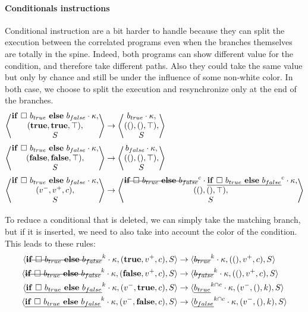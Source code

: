 \documentclass[a4paper,11pt]{article}
\newcommand\mathst[1]{\text{\st{$#1$}}}
\newcommand\mathul[1]{\text{\ul{$#1$}}}
\newcommand\rtstate[3]{\langle #1, #2, #3\rangle}
\newcommand\vrtstate[3]{\left\langle\begin{matrix}#1,\\#2,\\#3\end{matrix}\right\rangle}
\begin{document}
\paragraph{Conditionals instructions} Conditional instruction are a bit harder to handle because they can split the execution between the correlated programs even when the branches themselves are totally in the spine. Indeed, both programs can show different value for the condition, and therefore take different paths. Also they could take the same value but only by chance and still be under the influence of some non-white color. In both case, we choose to split the execution and resynchronize only at the end of the branches.
\begin{align*}
\vrtstate{\mathbf{if}\ \square\ b_{true}\ \mathbf{else}\ b_{false} \cdot  \kappa}{(\mathbf{true}, \mathbf{true}, \top)}{S} &\rightarrow \vrtstate{b_{true} \cdot \kappa}{((), (), \top)}{S}\\
\vrtstate{\mathbf{if}\ \square\ b_{true}\ \mathbf{else}\ b_{false} \cdot  \kappa}{(\mathbf{false}, \mathbf{false}, \top)}{S} &\rightarrow \vrtstate{b_{false} \cdot \kappa}{((), (), \top)}{S}\\
\vrtstate{\mathbf{if}\ \square\ b_{true}\ \mathbf{else}\ b_{false} \cdot \kappa}{(v^-, v^+, c)}{S} &\rightarrow \vrtstate{\mathst{\mathbf{if}\ \square\ b_{true}\ \mathbf{else}\ b_{false}}^c \cdot \mathul{\mathbf{if}\ \square\ b_{true}\ \mathbf{else}\ b_{false}}^c \cdot \kappa}{((), (), \top)}{S}\\
\end{align*}

To reduce a conditional that is deleted, we can simply take the matching branch, but if it is inserted, we need to also take into account the color of the condition. This leads to these rules:
\begin{align*}
\rtstate{\mathst{\mathbf{if}\ \square\ b_{true}\ \mathbf{else}\ b_{false}}^k \cdot  \kappa}{(\mathbf{true}, v^+, c)}{S} &\rightarrow \rtstate{\mathst{b_{true}}^k \cdot \kappa}{((), v^+, c)}{S}\\
\rtstate{\mathst{\mathbf{if}\ \square\ b_{true}\ \mathbf{else}\ b_{false}}^k \cdot  \kappa}{(\mathbf{false}, v^+, c)}{S} &\rightarrow \rtstate{\mathst{b_{false}}^k \cdot \kappa}{((), v^+, c)}{S}\\
\rtstate{\mathul{\mathbf{if}\ \square\ b_{true}\ \mathbf{else}\ b_{false}}^k \cdot \kappa}{(v^-, \mathbf{true}, c)}{S} &\rightarrow \rtstate{\mathul{b_{true}}^{k \cap c} \cdot \kappa}{(v^-, (), k)}{S}\\
\rtstate{\mathul{\mathbf{if}\ \square\ b_{true}\ \mathbf{else}\ b_{false}}^k \cdot \kappa}{(v^-, \mathbf{false}, c)}{S} &\rightarrow \rtstate{\mathul{b_{false}}^{k \cap c} \cdot \kappa}{(v^-, (), k)}{S}\\
\end{align*}
\end{document}
